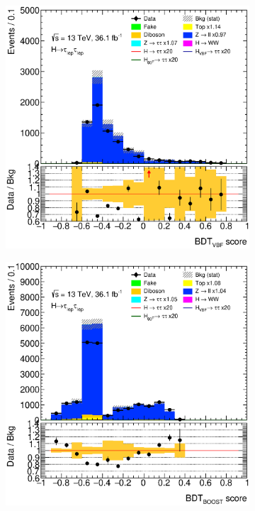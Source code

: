 \begin{figure}[htb]
\begin{subfigure}[t]{0.45\textwidth}
    \end{subfigure}
    \begin{subfigure}[t]{0.45\textwidth}
        \includegraphics[width=\textwidth]{./plots/mva/modeling/BDT/CRs/eemm-CutMVAVBFCatZllCR-BDT_VBF_CR-lin.eps}
    \end{subfigure}
    \begin{subfigure}[t]{0.45\textwidth}
        \includegraphics[width=\textwidth]{./plots/mva/modeling/BDT/CRs/eemm-CutMVABoostedCatZllCR-BDT_BOOST_CR-lin.eps}

\end{subfigure}
\end{figure}
